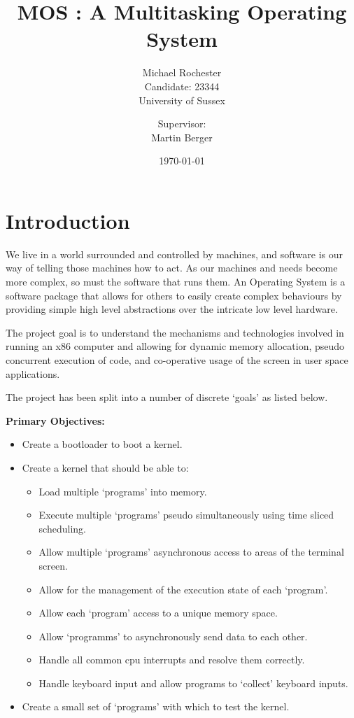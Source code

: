 \documentclass[a4paper]{report}
\title{MOS : A Multitasking Operating System}
\date{\today}
\author{Michael Rochester\\ Candidate: 23344\\ University of Sussex
        \and Supervisor:\\ Martin Berger}
\begin{document}
\titlespacing*{\chapter}{0pt}{-50pt}{20pt}
\titleformat{\chapter}[display]{\normalfont\huge\bfseries}{\chaptertitlename\ \thechapter}{20pt}{\Huge}


\maketitle

\tableofcontents
\listoffigures

\chapter{Introduction}
We live in a world surrounded and controlled by machines, and software is our way of telling those machines how to act. As our machines and needs become more complex, so must the software that runs them. An Operating System is a software package that allows for others to easily create complex behaviours by providing simple high level abstractions over the intricate low level hardware.

The project goal is to understand the mechanisms and technologies involved in running an x86 computer and allowing for dynamic memory allocation, pseudo concurrent execution of code, and co-operative usage of the screen in user space applications.

The project has been split into a number of discrete `goals' as listed below.


\textbf {Primary Objectives:}

\begin{itemize}
\item Create a bootloader to boot a kernel.
\item Create a kernel that should be able to:
\begin{itemize}
\item Load multiple `programs' into memory.
\item Execute multiple `programs' pseudo simultaneously using time sliced scheduling.
\item Allow multiple `programs' asynchronous access to areas of the terminal screen.
\item Allow for the management of the execution state of each `program'.
\item Allow each `program' access to a unique memory space.
\item Allow `programms' to asynchronously send data to each other.
\item Handle all common cpu interrupts and resolve them correctly.
\item Handle keyboard input and allow programs to `collect' keyboard inputs.
\end{itemize}
\item Create a small set of `programs' with which to test the kernel.
\end{itemize}
\end{document}
